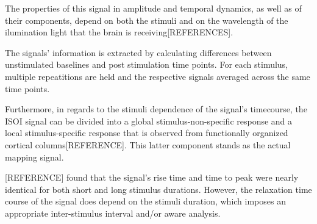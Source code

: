 The properties of this signal in amplitude and temporal dynamics, as well as of their components, depend on both the stimuli and on the wavelength of the ilumination light that the brain is receiving[REFERENCES].


The signals' information is extracted by calculating differences between unstimulated baselines and post stimulation time points. For each stimulus, multiple repeatitions are held and the respective signals averaged across the same time points.


Furthermore, in regards to the stimuli dependence of the signal's timecourse, the ISOI signal can be divided into a global stimulus-non-specific response and a local stimulus-specific response that is observed from functionally organized cortical columns[REFERENCE]. This latter component stands as the actual mapping signal. 

[REFERENCE] found that the signal's rise time and time to peak were nearly identical for both short and long stimulus durations. However, the  relaxation time course of the signal does depend on the stimuli duration, which imposes an appropriate inter-stimulus interval and/or aware analysis.